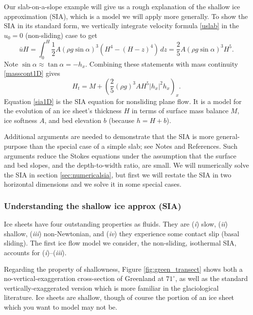 \documentclass[letterpaper,final,12pt,reqno]{amsart}
\begin{document}
Our slab-on-a-slope example will give us a rough explanation of the shallow ice approximation (SIA), which is a model we will apply more generally.  To show the SIA in its standard form, we vertically integrate velocity formula \eqref{uslab} in the $u_0=0$ (non-sliding) case to get
\begin{equation}
\bar u H = \int_0^H \frac{1}{2} A (\rho g \sin\alpha)^3  \left(H^4 - (H-z)^4\right)\,dz = \frac{2}{5} A (\rho g \sin\alpha)^3 H^5. \label{siaubar}
\end{equation}
Note $\sin \alpha \approx \tan\alpha = - h_x$.  Combining these statements with mass continuity \eqref{masscont1D} gives
\begin{equation}
  H_t = M + \left(\frac{2}{5} (\rho g)^3 A H^5 |h_x|^2 h_x\right)_x. \label{sia1D}
\end{equation}
Equation \eqref{sia1D} is the SIA equation for nonsliding plane flow.  It is a model for the evolution of an ice sheet's thickness $H$ in terms of surface mass balance $M$, ice softness $A$, and bed elevation $b$ (because $h=H+b$).

Additional arguments are needed to demonstrate that the SIA is more general-purpose than the special case of a simple slab; see Notes and References.  Such arguments reduce the Stokes equations under the assumption that the surface and bed slopes, and the depth-to-width ratio, are small.  We will numerically solve the SIA in section \ref{sec:numericalsia}, but first we will restate the SIA in two horizontal dimensions and we solve it in some special cases.

\subsubsection*{Understanding the shallow ice approx (SIA)}  Ice sheets have four outstanding properties as fluids.  They are (\emph{i}) slow, (\emph{ii}) shallow,  (\emph{iii}) non-Newtonian, and (\emph{iv}) they experience some contact slip (basal sliding).  The first ice flow model we consider, the non-sliding, isothermal SIA, accounts for (\emph{i})--(\emph{iii}).

Regarding the property of shallowness, Figure \ref{fig:green_transect} shows both a no-vertical-exaggeration cross-section of Greenland at $71^\circ$, as well as the standard vertically-exaggerated version which is more familiar in the glaciological literature.  Ice sheets are shallow, though of course the portion of an ice sheet which you want to model may not be.
\end{document}
